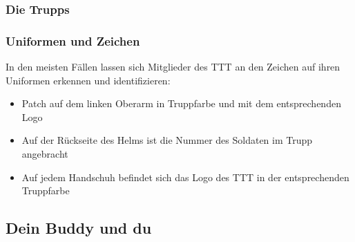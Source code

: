 \subsubsection{Die Trupps}


\subsubsection{Uniformen und Zeichen}
	In den meisten Fällen lassen sich Mitglieder des \ac{TTT} an den Zeichen auf ihren Uniformen erkennen und identifizieren:
		\begin{itemize}
			\item Patch auf dem linken Oberarm in Truppfarbe und mit dem entsprechenden Logo
			\item Auf der Rückseite des Helms ist die Nummer des Soldaten im Trupp angebracht
			\item Auf jedem Handschuh befindet sich das Logo des \ac{TTT} in der entsprechenden Truppfarbe
		\end{itemize}

\subsection{Dein Buddy und du}

